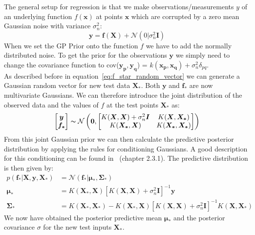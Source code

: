 \documentclass{article}
\begin{document}
The general setup for regression is that we make observations/measurements $y$
of an underlying function $f(\bm{x})$ at points $\bm{x}$ which are corrupted by
a zero mean Gaussian noise with variance $\sigma_n^2$:
\begin{equation}
    \bm{y} = \bm{f}(\bm{X}) + \mathcal{N}(0|\sigma_n^2 \bm{I})
\end{equation}
When we set the GP Prior onto the function $f$ we have to add the normally distributed noise. To get the prior for the observations $\bm{y}$ we simply need to change the covariance function to cov($\bm{y_p,y_q}$) = $k(\bm{x_p,x_q}) + \sigma_n^2\delta_{pq}$.\\
As described before in equation~\ref{eq:f_star_random_vector} we can generate a Gaussian random vector for new test data $\bm{X_*}$. Both $\bm{y}$ and $\bm{f_*}$ are now multivariate Gaussians. We can therefore introduce the joint distribution of the observed data and the values of $f$ at the test points $\bm{X_*}$ as:
\begin{equation}
    \label{eq:joint_f,X_*}
    \begin{aligned}
        \begin{bmatrix}
            \bm{y} \\
            \bm{f_*}
        \end{bmatrix}
        \thicksim  \mathcal{N}\left(\bm{0},
        \begin{bmatrix}
            K(\bm{X},\bm{X}) + \sigma_n^2 \bm{I} & K(\bm{X},\bm{X_*})   \\
            K(\bm{X_*},\bm{X})                   & K(\bm{X_*},\bm{X_*})
        \end{bmatrix}
        \right)
    \end{aligned}
\end{equation}
From this joint Gaussian prior we can then calculate the predictive posterior distribution by applying the rules for conditioning Gaussians. A good description for this conditioning can be found in~\cite{bishop} (chapter 2.3.1). The predictive distribution is then given by:
\begin{equation}
    \begin{aligned}
        \label{eq:general_kernel}
        p(\bm{f_*}|\bm{X},\bm{y},\bm{X_*}) & = \mathcal{N}(\bm{f_*|\bm{\mu_*}},\bm{\Sigma_*})                                                           \\
        \bm{\mu_*}                         & =  K(\bm{X_*},\bm{X}){[K(\bm{X},\bm{X}) + \sigma_n^2 \bm{I}]}^{-1} \bm{y}                                  \\
        \bm{\Sigma_*}                      & = K(\bm{X_*},\bm{X_*}) - K(\bm{X_*},\bm{X}){[K(\bm{X},\bm{X}) + \sigma_n^2 \bm{I}]}^{-1}K(\bm{X},\bm{X_*})
    \end{aligned}
\end{equation}
We now have obtained the posterior predictive mean $\bm{\mu_*}$ and the posterior covariance $\sigma$ for the new test inputs $\bm{X_*}$.
\end{document}
